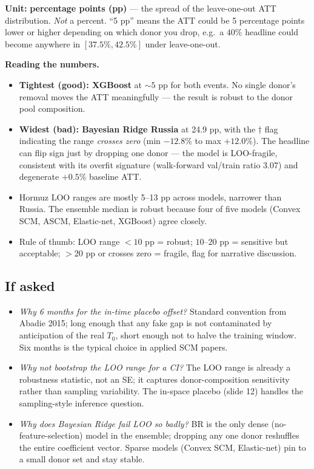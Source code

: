 \documentclass[11pt,a4paper]{article}
\newcommand{\highlight}[1]{\textcolor{accent}{\textbf{#1}}}
\begin{document}
\textbf{Unit:} \highlight{percentage points (pp)} --- the spread of the leave-one-out ATT distribution. \emph{Not} a percent. ``5 pp'' means the ATT could be 5 percentage points lower or higher depending on which donor you drop, e.g.\ a $40\%$ headline could become anywhere in $[37.5\%, 42.5\%]$ under leave-one-out.

\textbf{Reading the numbers.}
\begin{itemize}
  \item \textbf{Tightest (good): XGBoost} at $\sim 5$ pp for both events. No single donor's removal moves the ATT meaningfully --- the result is robust to the donor pool composition.
  \item \textbf{Widest (bad): Bayesian Ridge Russia} at 24.9 pp, with the $\dagger$ flag indicating the range \emph{crosses zero} (min $-12.8\%$ to max $+12.0\%$). The headline can flip sign just by dropping one donor --- the model is LOO-fragile, consistent with its overfit signature (walk-forward val/train ratio 3.07) and degenerate $+0.5\%$ baseline ATT.
  \item Hormuz LOO ranges are mostly 5--13 pp across models, narrower than Russia. The ensemble median is robust because four of five models (Convex SCM, ASCM, Elastic-net, XGBoost) agree closely.
  \item Rule of thumb: LOO range $< 10$ pp = robust; $10$--$20$ pp = sensitive but acceptable; $> 20$ pp or crosses zero = fragile, flag for narrative discussion.
\end{itemize}

\subsection{If asked}
\begin{itemize}
  \item \textit{Why 6 months for the in-time placebo offset?} Standard convention from Abadie 2015; long enough that any fake gap is not contaminated by anticipation of the real $T_0$, short enough not to halve the training window. Six months is the typical choice in applied SCM papers.
  \item \textit{Why not bootstrap the LOO range for a CI?} The LOO range is already a robustness statistic, not an SE; it captures donor-composition sensitivity rather than sampling variability. The in-space placebo (slide 12) handles the sampling-style inference question.
  \item \textit{Why does Bayesian Ridge fail LOO so badly?} BR is the only dense (no-feature-selection) model in the ensemble; dropping any one donor reshuffles the entire coefficient vector. Sparse models (Convex SCM, Elastic-net) pin to a small donor set and stay stable.
\end{itemize}
\end{document}
